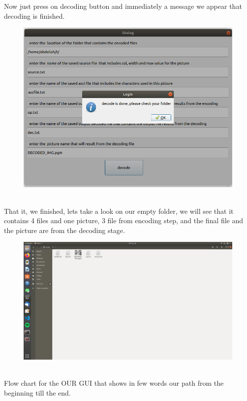 \documentclass[11 pt,twocolumn,letterpaper]{article}
\begin{document}
Now just press on decoding button and immediately a message we appear that decoding is finished.\\
\begin{figure}[ht]
\includegraphics[width=0.8\linewidth]{figure 7}
\end{figure} \\
\newpage
That it, we finished, lets take a look on our empty folder, we will see that it contains 4 files and one picture, 3 file from encoding step, and the final file and the picture are from the decoding stage.\\
\begin{figure}[ht]
\includegraphics[width=0.8\linewidth]{figure 8}
\end{figure}\\
\newpage
Flow chart for the OUR GUI  that shows in few words our path from the beginning till the end.\\
\end{document}
